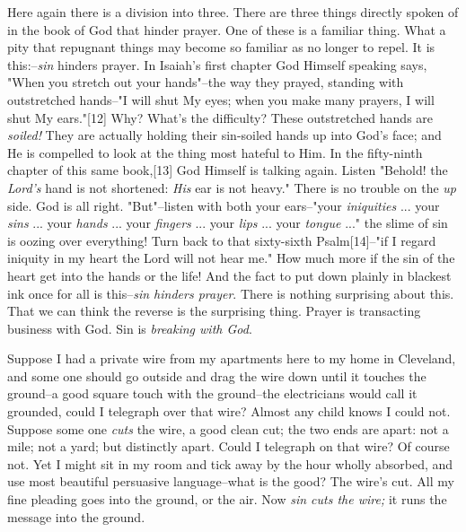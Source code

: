Here again there is a division into three. There are three things directly
spoken of in the book of God that hinder prayer. One of these is a
familiar thing. What a pity that repugnant things may become so familiar
as no longer to repel. It is this:--\textit{sin} hinders prayer. In Isaiah's
first chapter God Himself speaking says, "When you stretch out your
hands"--the way they prayed, standing with outstretched hands--"I will
shut My eyes; when you make many prayers, I will shut My ears."[12] Why?
What's the difficulty? These outstretched hands are \textit{soiled!} They are
actually holding their sin-soiled hands up into God's face; and He is
compelled to look at the thing most hateful to Him. In the fifty-ninth
chapter of this same book,[13] God Himself is talking again. Listen
"Behold! the \textit{Lord's} hand is not shortened: \textit{His} ear is not heavy."
There is no trouble on the \textit{up} side. God is all right. "But"--listen with
both your ears--"your \textit{iniquities} ... your \textit{sins} ... your \textit{hands} ...
your \textit{fingers} ... your \textit{lips} ... your \textit{tongue} ..." the slime of sin is
oozing over everything! Turn back to that sixty-sixth Psalm[14]--"if I
regard iniquity in my heart the Lord will not hear me." How much more if
the sin of the heart get into the hands or the life! And the fact to put
down plainly in blackest ink once for all is this--\textit{sin hinders prayer}.
There is nothing surprising about this. That we can think the reverse is
the surprising thing. Prayer is transacting business with God. Sin is
\textit{breaking with God}.

Suppose I had a private wire from my apartments here to my home in
Cleveland, and some one should go outside and drag the wire down until it
touches the ground--a good square touch with the ground--the electricians
would call it grounded, could I telegraph over that wire? Almost any child
knows I could not. Suppose some one \textit{cuts} the wire, a good clean cut; the
two ends are apart: not a mile; not a yard; but distinctly apart. Could I
telegraph on that wire? Of course not. Yet I might sit in my room and tick
away by the hour wholly absorbed, and use most beautiful persuasive
language--what is the good? The wire's cut. All my fine pleading goes into
the ground, or the air. Now \textit{sin cuts the wire;} it runs the message into
the ground.

